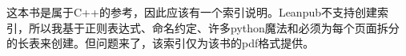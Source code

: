 这本书是属于C++的参考，因此应该有一个索引说明。Leanpub不支持创建索引，所以我基于正则表达式、命名约定、许多python魔法和必须为每个页面拆分的长表来创建。但问题来了，该索引仅为该书的pdf格式提供。